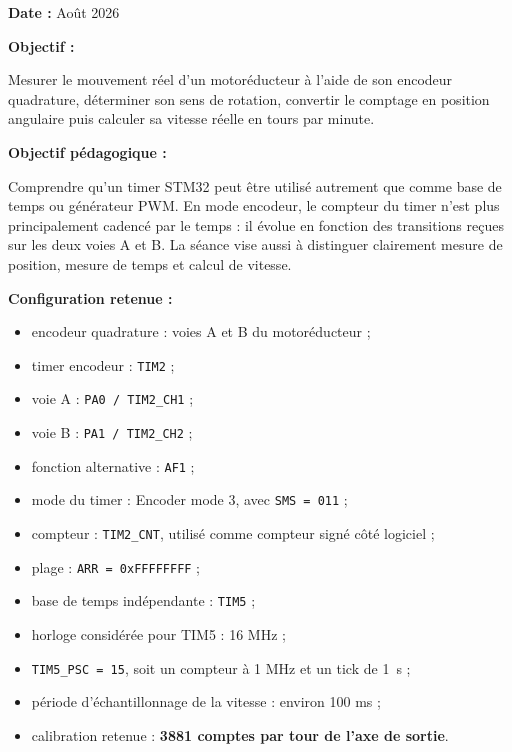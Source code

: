 \documentclass[11pt,a4paper]{article}
\begin{document}
	\begin{sessionbox}
		
		\textbf{Date :} Août 2026
		
		\vspace{0.3cm}
		
		\textbf{Objectif :}
		
		Mesurer le mouvement réel d'un motoréducteur à l'aide de son encodeur quadrature, déterminer son sens de rotation, convertir le comptage en position angulaire puis calculer sa vitesse réelle en tours par minute.
		
		\vspace{0.3cm}
		
		\textbf{Objectif pédagogique :}
		
		Comprendre qu'un timer STM32 peut être utilisé autrement que comme base de temps ou générateur PWM. En mode encodeur, le compteur du timer n'est plus principalement cadencé par le temps : il évolue en fonction des transitions reçues sur les deux voies A et B. La séance vise aussi à distinguer clairement mesure de position, mesure de temps et calcul de vitesse.
		
		\vspace{0.3cm}
		
		\textbf{Configuration retenue :}
		
		\begin{itemize}
			\item encodeur quadrature : voies A et B du motoréducteur ;
			\item timer encodeur : \texttt{TIM2} ;
			\item voie A : \texttt{PA0 / TIM2\_CH1} ;
			\item voie B : \texttt{PA1 / TIM2\_CH2} ;
			\item fonction alternative : \texttt{AF1} ;
			\item mode du timer : Encoder mode 3, avec \texttt{SMS = 011} ;
			\item compteur : \texttt{TIM2\_CNT}, utilisé comme compteur signé côté logiciel ;
			\item plage : \texttt{ARR = 0xFFFFFFFF} ;
			\item base de temps indépendante : \texttt{TIM5} ;
			\item horloge considérée pour TIM5 : 16 MHz ;
			\item \texttt{TIM5\_PSC = 15}, soit un compteur à 1 MHz et un tick de 1~\textmu s ;
			\item période d'échantillonnage de la vitesse : environ 100 ms ;
			\item calibration retenue : \textbf{3881 comptes par tour de l'axe de sortie}.
		\end{itemize}
		

\end{sessionbox}
\end{document}
